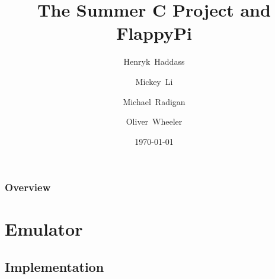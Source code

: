 \documentclass{beamer}
\title[FlappyPi]{The Summer C Project and FlappyPi} %
\author[Group 16]{\small Henryk~Haddass \and Mickey~Li \and Michael~Radigan \and Oliver~Wheeler}%
\institute[Imperial DoC] %
{
Group 16
\medskip
}
\date{\today} %
\begin{document}
\begin{frame}
\titlepage %
\end{frame}

\begin{frame}
\frametitle{Overview} %
\tableofcontents %
\end{frame}


\section{Emulator} %


\subsection{Implementation} %
\end{document}
